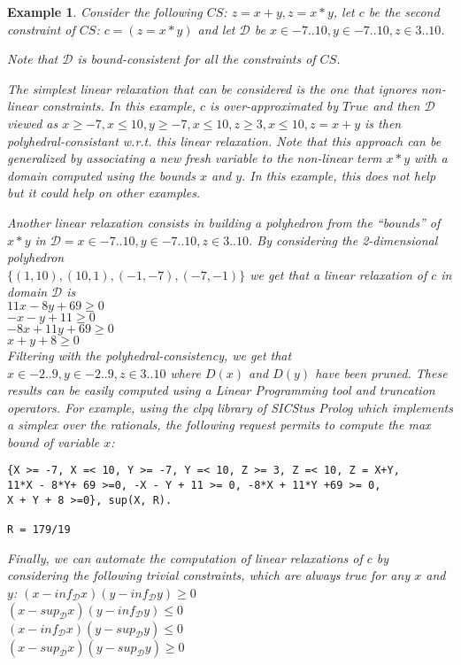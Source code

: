 \documentclass[submission,copyright,creativecommons]{eptcs}
\newtheorem{example}{Example}
\begin{document}
\begin{example}
Consider the following $CS$: $z = x+y, z = x*y$, let $c$ be the second constraint of $CS$: $c = (z = x*y)$
and let $\mathcal{D}$ be $x \in -7 .. 10, y \in -7 .. 10, z \in 3 .. 10$.

\noindent
Note that $\mathcal{D}$ is bound-consistent for all the constraints of $CS$.

\noindent
The simplest linear relaxation that can be considered is the one that ignores non-linear constraints.
In this example, $c$ is over-approximated by $True$  and then $\mathcal{D}$ viewed as  
$x \geq -7, x \leq 10, y \geq -7, x \leq 10, z \geq 3, x \leq 10, z = x+y$ is then
polyhedral-consistant w.r.t. this linear relaxation. Note that this approach can be generalized by
associating a new fresh variable to the non-linear term $x*y$ with a domain computed using the
bounds $x$ and $y$. In this example, this does not help but it could help on other examples.

\noindent
Another linear relaxation consists in building a polyhedron from the ``bounds'' of $x*y$
in $\mathcal{D} = x \in -7 .. 10, y \in -7 .. 10, z \in 3 .. 10$. By considering the 2-dimensional 
polyhedron\\ 
$\{(1,10), (10,1), (-1,-7),(-7,-1)\}$ we get that a linear relaxation of $c$ in
domain $\mathcal{D}$ is\\ 
$11x - 8y +69 \geq 0$\\
$-x -y +11 \geq 0$\\
$-8x + 11y + 69 \geq 0$\\
$x + y + 8 \geq 0$\\  
Filtering with the polyhedral-consistency, we get that
$x \in -2 .. 9, y \in -2 .. 9, z \in 3 .. 10$ where $D(x)$ and $D(y)$ have been pruned.
These results can be easily computed using a Linear Programming tool and truncation operators. For example,
using the clpq library of SICStus Prolog which implements
a simplex over the rationals, the following request permits to compute the max bound of variable $x$:
\begin{verbatim} 
{X >= -7, X =< 10, Y >= -7, Y =< 10, Z >= 3, Z =< 10, Z = X+Y, 
11*X - 8*Y+ 69 >=0, -X - Y + 11 >= 0, -8*X + 11*Y +69 >= 0, 
X + Y + 8 >=0}, sup(X, R).

R = 179/19   \end{verbatim}

Finally, we can automate the computation of linear relaxations of $c$
by considering the following trivial constraints, which are always true for
any $x$ and $y$:
$(x-inf_{\mathcal{D}} x)(y - inf_{\mathcal{D}} y) \geq 0$\\
$(x-sup_{\mathcal{D}} x)(y - inf_{\mathcal{D}} y) \leq 0$\\
$(x-inf_{\mathcal{D}} x)(y - sup_{\mathcal{D}} y) \leq 0$\\
$(x-sup_{\mathcal{D}} x)(y - sup_{\mathcal{D}} y) \geq 0$\\


\end{example}
\end{document}
